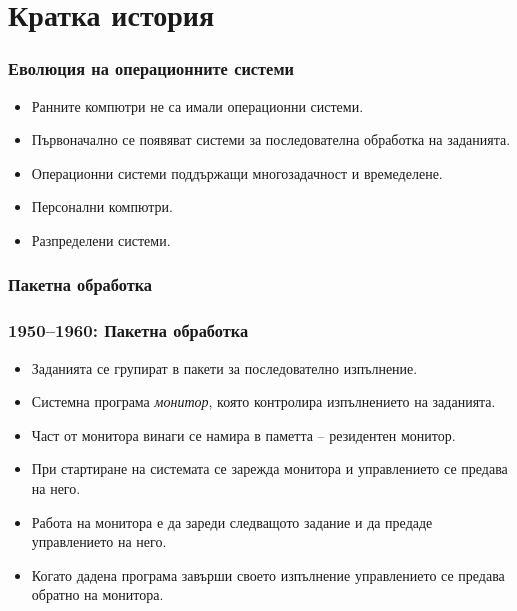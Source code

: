 \documentclass[ignorenonframetext, hyperref=unicode]{beamer}
\begin{document}
\section{Кратка история}

\begin{frame}
\frametitle{Еволюция на операционните системи}
\begin{itemize}
\item Ранните компютри не са имали операционни системи.
\item Първоначално се появяват системи за последователна обработка на заданията.
\item Операционни системи поддържащи многозадачност и времеделене.
\item Персонални компютри.
\item Разпределени системи.
\end{itemize}
\end{frame}

\subsubsection{Пакетна обработка}

\begin{frame}
\frametitle{1950--1960: Пакетна обработка}
\begin{itemize}
  \item Заданията се групират в пакети за последователно
  изпълнение.
  \item Системна програма {\em монитор}, която контролира изпълнението на
  заданията. 
  \item Част от монитора винаги се намира в паметта -- резидентен монитор.
  \item При стартиране на системата се зарежда монитора и управлението се
  предава на него.
  \item Работа на монитора е да зареди следващото задание и да предаде
  управлението на него.
  \item Когато дадена програма завърши своето изпълнение управлението се предава
  обратно на монитора.
\end{itemize}
\end{frame}
\end{document}

